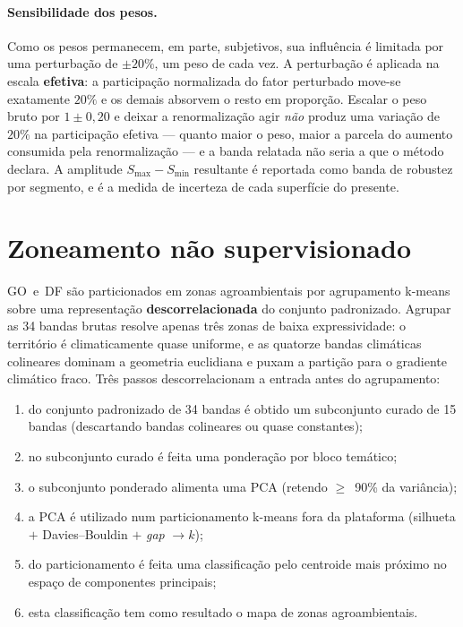 \paragraph{Sensibilidade dos pesos.}
Como os pesos permanecem, em parte, subjetivos, sua influência é limitada por uma perturbação de
$\pm 20\%$, um peso de cada vez. A perturbação é aplicada na escala \textbf{efetiva}: a participação
normalizada do fator perturbado move-se exatamente $20\%$ e os demais absorvem o resto em proporção.
Escalar o peso bruto por $1 \pm 0{,}20$ e deixar a renormalização agir \emph{não} produz uma variação
de $20\%$ na participação efetiva --- quanto maior o peso, maior a parcela do aumento consumida pela
renormalização --- e a banda relatada não seria a que o método declara. A amplitude
$S_{\max} - S_{\min}$ resultante é reportada como banda de robustez por segmento, e é a medida de
incerteza de cada superfície do presente.

\section{Zoneamento não supervisionado}\label{sec:zoning}

GO~e~DF são particionados em zonas agroambientais por agrupamento k-means sobre uma representação
\textbf{descorrelacionada} do conjunto padronizado. Agrupar as 34 bandas brutas resolve apenas três
zonas de baixa expressividade: o território é climaticamente quase uniforme, e as quatorze bandas
climáticas colineares dominam a geometria euclidiana e puxam a partição para o gradiente climático
fraco. Três passos descorrelacionam a entrada antes do agrupamento:

\begin{enumerate}
  \item do conjunto padronizado de 34 bandas é obtido um subconjunto curado de 15 bandas
    (descartando bandas colineares ou quase constantes);
  \item no subconjunto curado é feita uma ponderação por bloco temático;
  \item o subconjunto ponderado alimenta uma PCA (retendo $\geq$~90\% da variância); 
  \item a PCA é utilizado num particionamento k-means fora da plataforma (silhueta $+$ Davies--Bouldin $+$ \emph{gap} $\rightarrow k$);
  \item do particionamento é feita uma classificação pelo centroide mais próximo no espaço de componentes principais;
  \item esta classificação tem como resultado o mapa de zonas agroambientais.
\end{enumerate}

